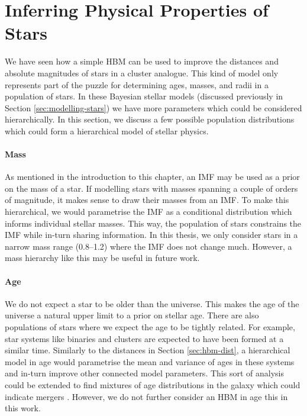 \section[Stellar Properties]{Inferring Physical Properties of Stars}\label{sec:hbm-phys}

We have seen how a simple HBM can be used to improve the distances and absolute magnitudes of stars in a cluster analogue. This kind of model only represents part of the puzzle for determining ages, masses, and radii in a population of stars. In these Bayesian stellar models (discussed previously in Section \ref{sec:modelling-stars}) we have more parameters which could be considered hierarchically. In this section, we discuss a few possible population distributions which could form a hierarchical model of stellar physics.

\paragraph{Mass} As mentioned in the introduction to this chapter, an IMF may be used as a prior on the mass of a star. If modelling stars with masses spanning a couple of orders of magnitude, it makes sense to draw their masses from an IMF. To make this hierarchical, we would parametrise the IMF as a conditional distribution which informs individual stellar masses. This way, the population of stars constrains the IMF while in-turn sharing information. In this thesis, we only consider stars in a narrow mass range (\SIrange{0.8}{1.2}{\solarmass}) where the IMF does not change much. However, a mass hierarchy like this may be useful in future work.

\paragraph{Age} We do not expect a star to be older than the universe. This makes the age of the universe a natural upper limit to a prior on stellar age. There are also populations of stars where we expect the age to be tightly related. For example, star systems like binaries and clusters are expected to have been formed at a similar time. Similarly to the distances in Section \ref{sec:hbm-dist}, a hierarchical model in age would parametrise the mean and variance of ages in these systems and in-turn improve other connected model parameters. This sort of analysis could be extended to find mixtures of age distributions in the galaxy which could indicate mergers \citep[e.g. \emph{Gaia}-Enceladus;][]{Helmi.Babusiaux.ea2018}. However, we do not further consider an HBM in age this in this work.

